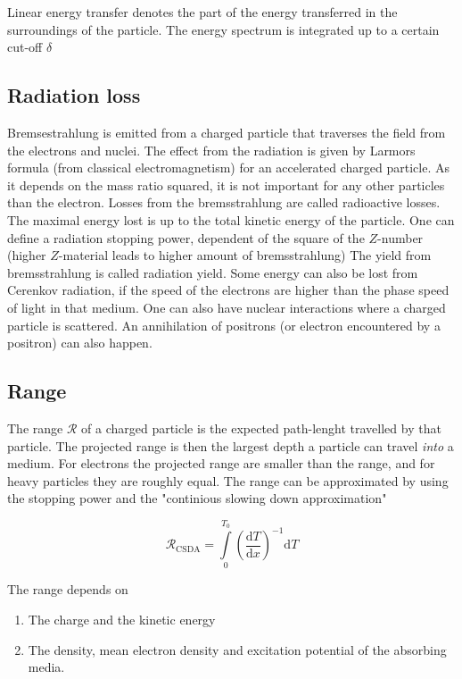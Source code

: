 Linear energy transfer denotes the part of the energy transferred in the surroundings of the particle.
The energy spectrum is integrated up to a certain cut-off $\delta$

\subsection{Radiation loss}

Bremsestrahlung is emitted from a charged particle that traverses the field from the electrons and nuclei. 
The effect from the radiation is given by Larmors formula (from classical electromagnetism) for an accelerated charged particle.
As it depends on the mass ratio squared, it is not important for any other particles than the electron.
Losses from the bremsstrahlung are called radioactive losses. 
The maximal energy lost is up to the total kinetic energy of the particle.
One can define a radiation stopping power, dependent of the square of the $Z$-number (higher $Z$-material leads to higher amount of bremsstrahlung)
The yield from bremsstrahlung is called radiation yield.
Some energy can also be lost from Cerenkov radiation, if the speed of the electrons are higher than the phase speed of light in that medium.
One can also have nuclear interactions where a charged particle is scattered.
An annihilation of positrons (or electron encountered by a positron) can also happen.

\subsection{Range}

The range $\mathcal{R}$ of a charged particle is the expected path-lenght travelled by that particle. The projected range is then the largest depth a particle can travel \emph{into} a medium. 
For electrons the projected range are smaller than the range, and for heavy particles they are roughly equal.
The range can be approximated by using the stopping power and the "continious slowing down approximation"

\begin{equation}
    \mathcal{R}_{\mathrm{CSDA}} = \int \limits_0^{T_0} \left ( \frac{\mathrm{d}T}{\mathrm{d}x} \right )^{-1} \mathrm{d}T
\end{equation}

The range depends on

\begin{enumerate}
    \item 
    The charge and the kinetic energy
    \item
    The density, mean electron density and excitation potential of the absorbing media.
\end{enumerate}

